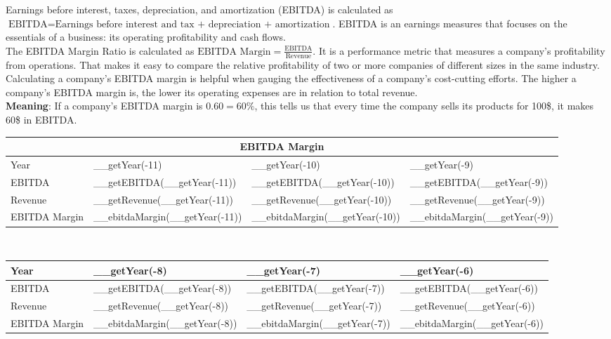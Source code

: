 Earnings before interest, taxes, depreciation, and amortization (EBITDA) is calculated as
$\text{EBITDA} = \text{Earnings before interest and tax + depreciation + amortization}$.
EBITDA is an earnings measures that focuses on the essentials of a business: its
operating profitability and cash flows.\\
The EBITDA Margin Ratio is calculated as
$\text{EBITDA Margin} = \frac{\text{EBITDA}}{\text{Revenue}}$.
It is a performance metric that measures a company's profitability from
operations. That makes it easy to compare the relative profitability of two or
more companies of different sizes in the same industry. Calculating a company's
EBITDA margin is helpful when gauging the effectiveness of a company's cost-cutting
efforts. The higher a company's EBITDA margin is, the lower its operating expenses
are in relation to total revenue.\\
\textbf{Meaning}: If a company's EBITDA margin is $0.60 = 60\%$, this tells us
that every time the company sells its products for 100\$, it makes 60\$ in EBITDA.\\

\begin{tabularx}{\textwidth}{|X|X|X|X|}
 \hline
 \multicolumn{4}{|c|}{EBITDA Margin} \\
 \hline
 Year                               & __getYear(-11)                 & __getYear(-10)                 & __getYear(-9)                 \\
 \hline
 EBITDA                             & __getEBITDA(__getYear(-11))    & __getEBITDA(__getYear(-10))    & __getEBITDA(__getYear(-9))    \\
 Revenue                            & __getRevenue(__getYear(-11))   & __getRevenue(__getYear(-10))   & __getRevenue(__getYear(-9))   \\
 \rowcolor{lightgray} EBITDA Margin & __ebitdaMargin(__getYear(-11)) & __ebitdaMargin(__getYear(-10)) & __ebitdaMargin(__getYear(-9)) \\
 \hline
\end{tabularx}\\

\begin{tabularx}{\textwidth}{|X|X|X|X|}
 \hline
 Year                               & __getYear(-8)                 & __getYear(-7)                 & __getYear(-6)                 \\
 \hline
 EBITDA                             & __getEBITDA(__getYear(-8))    & __getEBITDA(__getYear(-7))    & __getEBITDA(__getYear(-6))    \\
 Revenue                            & __getRevenue(__getYear(-8))   & __getRevenue(__getYear(-7))   & __getRevenue(__getYear(-6))   \\
 \rowcolor{lightgray} EBITDA Margin & __ebitdaMargin(__getYear(-8)) & __ebitdaMargin(__getYear(-7)) & __ebitdaMargin(__getYear(-6)) \\
 \hline
\end{tabularx}\\

